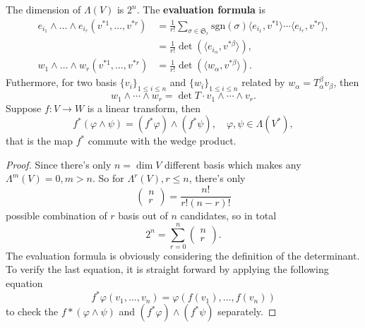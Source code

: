 \begin{theorem}
The dimension of $\Lambda(V)$ is $2^n$. The \textbf{evaluation formula} is 
\begin{equation}
\begin{aligned}
e_{i_1}\wedge\dots\wedge e_{i_r}(v^{*1},\dots,v^{*r})&=\frac{1}{r!}\sum_{\sigma\in\mathfrak{S}_r}\text{sgn}(\sigma)\langle e_{i_1},v^{*1}\rangle\cdots\langle e_{i_r},v^{*r}\rangle,\\
&=\frac{1}{r!}\det(\langle e_{i_\alpha},v^{*\beta}\rangle),\\
w_{1}\wedge\dots\wedge w_{r}(v^{*1},\dots,v^{*r})&=\frac{1}{r!}\det(\langle w_{\alpha},v^{*\beta}\rangle).
\end{aligned}
\end{equation}
Futhermore, for two basis $\{v_i\}_{1\le i\le n}$ and $\{w_i\}_{1\le i\le n}$ related by $w_\alpha=T^\beta_\alpha v_\beta$, then
\begin{equation}
w_1\wedge\cdots\wedge w_r= \det T\cdot v_1\wedge\cdots\wedge v_r.
\end{equation}
Suppose $f:V\to W$ is a linear transform, then
\begin{equation}
f^*(\varphi\wedge\psi)=(f^*\varphi)\wedge(f^*\psi),\quad \varphi,\psi\in \Lambda(V^*),
\end{equation}
that is the map $f^*$ commute with the wedge product.
\end{theorem}

\begin{proof}
Since there's only $n=\dim V$ different basis which makes any $\Lambda^{m}(V)=0,m>n$. So for $\Lambda^r(V),r\le n$, there's only
\begin{equation}
\left(
\begin{aligned}
n\\ r
\end{aligned}
\right)=\frac{n!}{r!(n-r)!}
\end{equation}
possible combination of $r$ basis out of $n$ candidates, so in total
\begin{equation}
2^n=\sum_{r=0}^n\left(
\begin{aligned}
n\\ r
\end{aligned}
\right).
\end{equation}
The evaluation formula is obviously considering the definition of the determinant. To verify the last equation, it is straight forward by applying the following equation
\begin{equation}
f^*\varphi(v_1,\dots,v_n)=\varphi(f(v_1),\dots,f(v_n))
\end{equation}
to check the $f*(\varphi\wedge\psi)$ and $(f^*\varphi)\wedge(f^*\psi)$ separately.
\end{proof}

